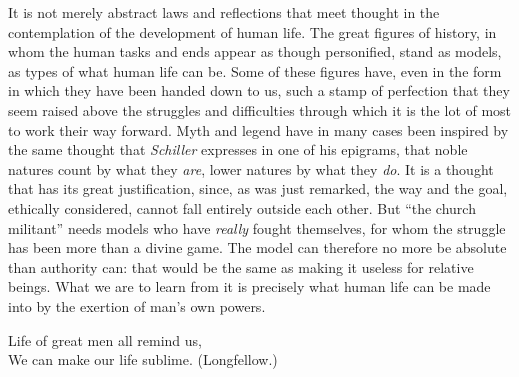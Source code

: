 \documentclass[12pt,a4paper,openany]{book}
\newcommand{\opage}[1]{\marginnote{\footnotesize\textit{[#1]}}}
\begin{document}
It is not merely abstract laws and reflections that meet thought in the
contemplation of the development of human life. The great figures of history,
in whom the human tasks and ends appear as though personified, stand as
\opage{82}models, as types of what human life can be. Some of these figures
have, even in the form in which they have been handed down to us, such a stamp
of perfection that they seem raised above the struggles and difficulties
through which it is the lot of most to work their way forward. Myth and legend
have in many cases been inspired by the same thought that \emph{Schiller}
expresses in one of his epigrams, that noble natures count by what they
\emph{are}, lower natures by what they \emph{do}. It is a thought that has its
great justification, since, as was just remarked, the way and the goal,
ethically considered, cannot fall entirely outside each other. But ``the
church militant'' needs models who have \emph{really} fought themselves,
for whom the struggle has been more than a divine game. The model can
therefore no more be absolute than authority can: that would be the same as
making it useless for relative beings. What we are to learn from it is
precisely what human life can be made into by the exertion of man's own
powers.

Life of great men all remind us,\\
We can make our life sublime. (Longfellow.)
\end{document}
